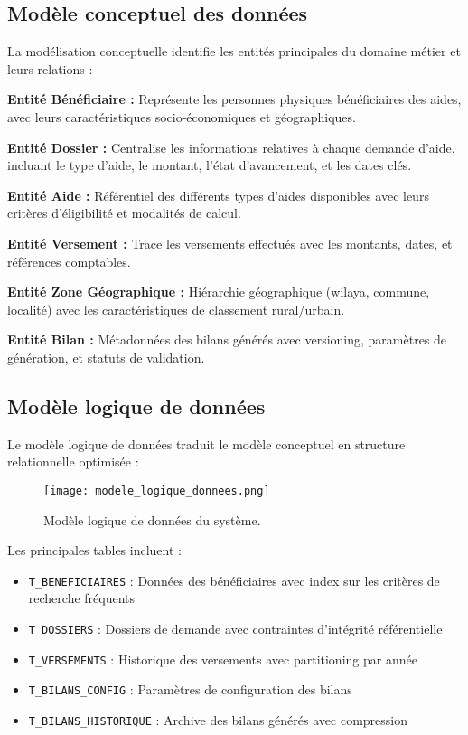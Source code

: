 \subsection{Modèle conceptuel des données}

La modélisation conceptuelle identifie les entités principales du domaine métier et leurs relations :

\medskip

\textbf{Entité Bénéficiaire :} Représente les personnes physiques bénéficiaires des aides, avec leurs caractéristiques socio-économiques et géographiques.

\textbf{Entité Dossier :} Centralise les informations relatives à chaque demande d'aide, incluant le type d'aide, le montant, l'état d'avancement, et les dates clés.

\textbf{Entité Aide :} Référentiel des différents types d'aides disponibles avec leurs critères d'éligibilité et modalités de calcul.

\textbf{Entité Versement :} Trace les versements effectués avec les montants, dates, et références comptables.

\textbf{Entité Zone Géographique :} Hiérarchie géographique (wilaya, commune, localité) avec les caractéristiques de classement rural/urbain.

\textbf{Entité Bilan :} Métadonnées des bilans générés avec versioning, paramètres de génération, et statuts de validation.

\subsection{Modèle logique de données}

Le modèle logique de données traduit le modèle conceptuel en structure relationnelle optimisée :

\begin{figure}[hbt!]
    \centering
    \texttt{[image: modele\_logique\_donnees.png]}
    \caption{Modèle logique de données du système.}
    \label{fig:modele-logique}
\end{figure}

Les principales tables incluent :

\begin{itemize}
    \item \texttt{T\_BENEFICIAIRES} : Données des bénéficiaires avec index sur les critères de recherche fréquents
    \item \texttt{T\_DOSSIERS} : Dossiers de demande avec contraintes d'intégrité référentielle
    \item \texttt{T\_VERSEMENTS} : Historique des versements avec partitioning par année
    \item \texttt{T\_BILANS\_CONFIG} : Paramètres de configuration des bilans
    \item \texttt{T\_BILANS\_HISTORIQUE} : Archive des bilans générés avec compression
\end{itemize}

